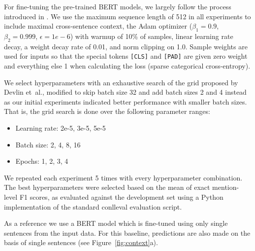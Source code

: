 \documentclass[11pt]{article}
\begin{document}
For fine-tuning the pre-trained BERT models, we largely follow the process introduced in \cite{devlin2018bert}.
We use the maximum sequence length of 512 in all experiments to include maximal cross-sentence context, the Adam optimizer \cite{kingma2014adam} ($\beta_1 = 0.9$, $\beta_2 = 0.999$, $\epsilon = 1e-6$) with warmup of 10\% of samples, linear learning rate decay, a weight decay rate of 0.01, and norm clipping on 1.0. Sample weights are used for inputs so that the special tokens \texttt{[CLS]} and \texttt{[PAD]} are given zero weight and everything else 1 when calculating the loss (sparse categorical cross-entropy).
 
We select hyperparameters with an exhaustive search of the grid proposed by Devlin et~al., modified to skip batch size 32 and add batch sizes 2 and 4 instead as our initial experiments indicated better performance with smaller batch sizes. That is, the grid search is done over the following parameter ranges: 
\begin{itemize}
    \setlength\itemsep{-0.5em}
    \item Learning rate: 2e-5, 3e-5, 5e-5 
    \item Batch size: 2, 4, 8, 16
    \item Epochs: 1, 2, 3, 4
\end{itemize}
We repeated each experiment 5 times with every hyperparameter combination. The best hyperparameters were selected based on the mean of exact mention-level F1 scores, as evaluated against the development set using a Python implementation of the standard conlleval evaluation script.

As a reference we use a BERT model which is fine-tuned using only single sentences from the input data. For this baseline, predictions are also made on the basis of single sentences (see Figure~\ref{fig:context}a).
\end{document}

